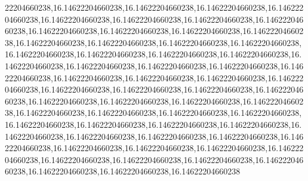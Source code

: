 22204660238,16.14622204660238,16.14622204660238,16.14622204660238,16.14622204660238,16.14622204660238,16.14622204660238,16.14622204660238,16.14622204660238,16.14622204660238,16.14622204660238,16.14622204660238,16.14622204660238,16.14622204660238,16.14622204660238,16.14622204660238,16.14622204660238,16.14622204660238,16.14622204660238,16.14622204660238,16.14622204660238,16.14622204660238,16.14622204660238,16.14622204660238,16.14622204660238,16.14622204660238,16.14622204660238,16.14622204660238,16.14622204660238,16.14622204660238,16.14622204660238,16.14622204660238,16.14622204660238,16.14622204660238,16.14622204660238,16.14622204660238,16.14622204660238,16.14622204660238,16.14622204660238,16.14622204660238,16.14622204660238,16.14622204660238,16.14622204660238,16.14622204660238,16.14622204660238,16.14622204660238,16.14622204660238,16.14622204660238,16.14622204660238,16.14622204660238,16.14622204660238,16.14622204660238,16.14622204660238,16.14622204660238,16.14622204660238,16.14622204660238,16.14622204660238,16.14622204660238,16.14622204660238,16.14622204660238,16.14622204660238,16.14622204660238
